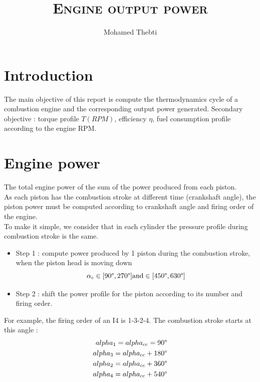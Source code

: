 \documentclass[12pt,a4paper]{article}
\title{
	\Huge\textsc{Engine output power}
}
\author{Mohamed Thebti}
\begin{document}
	\setlength{\parindent}{0mm}
	
	\fancyhead[R]{\slshape \leftmark}
	
	\fancyfoot[C]{}
	\fancyfoot[R]{\thepage}
	
	\maketitle
	\newpage
	
	\tableofcontents
	
	\newpage
	
	
	\section{Introduction}
	
	The main objective of this report is compute the thermodynamics cycle of a combustion engine and the corresponding output power generated. 
	Secondary objective : torque profile $T(RPM)$, efficiency $\eta$, fuel consumption profile according to the engine RPM.
	
	
	
	\section{Engine power}
	
	The total engine power of the sum of the power produced from each piston. \\
	As each piston has the combustion stroke at different time (crankshaft angle), the piston power must be computed according to crankshaft angle and firing order of the engine. \\
	To make it simple, we consider that in each cylinder the pressure profile during combustion stroke is the same. 
	\begin{itemize}
		\item Step 1 : compute power produced by 1 piston during the combustion stroke, when the piston head is moving down
	\begin{equation}
		\alpha_{c} \in [90 \degree, 270 \degree] \text{and} \in [450 \degree, 630 \degree]
	\end{equation}
		\item Step 2 : shift the power profile for the piston according to its number and firing order.
	\end{itemize}
	For example, the firing order of an I4 is 1-3-2-4. The combustion stroke starts at this angle :  
	\begin{eqnarray}
		alpha_1 = alpha_{cc} = 90\degree\\
		alpha_3 = alpha_{cc} + 180\degree\\
		alpha_2 = alpha_{cc} + 360\degree\\
		alpha_4 = alpha_{cc} + 540\degree
	\end{eqnarray}
\end{document}
